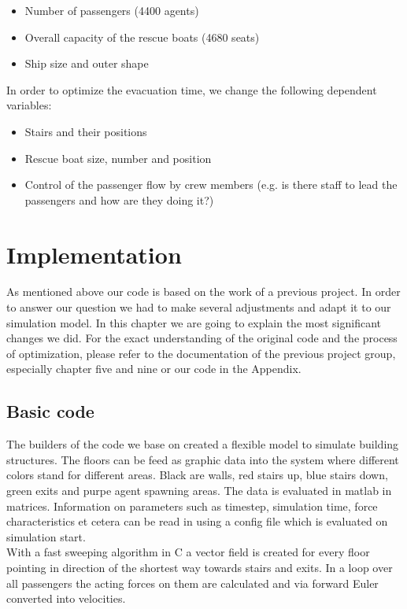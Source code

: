 \documentclass[11pt]{article}
\begin{document}
\begin{itemize}
\item Number of passengers (4400 agents)
\item Overall capacity of the rescue boats (4680 seats)
\item Ship size and outer shape
\end{itemize}

In order to optimize the evacuation time, we change the following dependent variables:
\begin{itemize}
\item Stairs and their positions
\item Rescue boat size, number and position
\item Control of the passenger flow by crew members (e.g. is there staff to lead the passengers and how are they doing it?)
\end{itemize}


\newpage
\section{Implementation}
As mentioned above our code is based on the work of a previous project. In order to answer our question we had to make several adjustments and adapt it to our simulation model. In this chapter we are going to explain the most significant changes we did. For the exact understanding of the original code and the process of optimization, please refer to the documentation of the previous project group, especially chapter five and nine\cite{Building} or our code in the Appendix.

\subsection{Basic code}
The builders of the code we base on created a flexible model to simulate building structures. The floors can be feed as graphic data into the system where different colors stand for different areas. Black are walls, red stairs up, blue stairs down, green exits and purpe agent spawning areas. The data is evaluated in matlab in matrices. Information on parameters such as timestep, simulation time, force characteristics et cetera can be read in using a config file which is evaluated on simulation start.\\
With a fast sweeping algorithm in C a vector field is created for every floor pointing in direction of the shortest way towards stairs and exits. In a loop over all passengers the acting forces on them are calculated and via forward Euler converted into velocities. 
\end{document}
